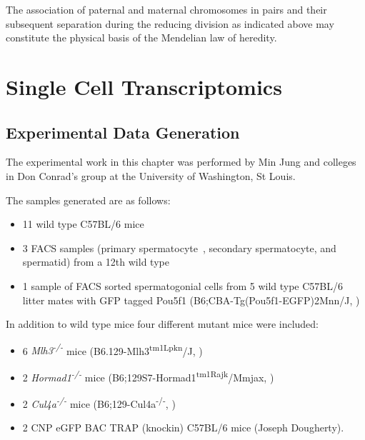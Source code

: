 \begin{savequote}[8cm]
The association of paternal and maternal chromosomes in pairs and their subsequent separation during the reducing division as indicated above may constitute the physical basis of the Mendelian law of heredity.
\end{savequote}

\chapter{\label{ch:2-SDA} Single Cell Transcriptomics}

\minitoc

\section{Experimental Data Generation}

The experimental work in this chapter was performed by Min Jung and colleges in Don Conrad's group at the University of Washington, St Louis.

The samples generated are as follows:

\begin{itemize}
	\item 11 wild type C57BL/6 mice
	\item 3 FACS samples (primary spermatocyte , secondary spermatocyte, and spermatid) from a 12th wild type
	\item 1 sample of FACS sorted spermatogonial cells from 5 wild type C57BL/6 litter mates with GFP tagged Pou5f1 (B6;CBA-Tg(Pou5f1-EGFP)2Mnn/J, \cite{Szabo2002Allelespecific})
\end{itemize}

In addition to wild type mice four different mutant mice were included:
\begin{itemize}
	\item 6 \textit{Mlh3\textsuperscript{-/-}} mice (B6.129-Mlh3\textsuperscript{tm1Lpkn}/J, \cite{Lipkin2002Meiotic})
	\item 2 \textit{Hormad1\textsuperscript{-/-}} mice (B6;129S7-Hormad1\textsuperscript{tm1Rajk}/Mmjax, \cite{Shin2010Hormad1})
	\item 2 \textit{Cul4a\textsuperscript{-/-}} mice (B6;129-Cul4a\textsuperscript{-/-}, \cite{Yin2011E3})
	\item 2 CNP eGFP BAC TRAP (knockin) C57BL/6 mice (Joseph Dougherty).
\end{itemize}

